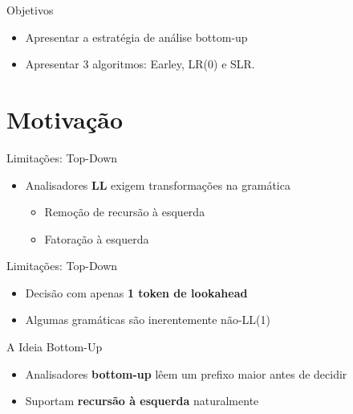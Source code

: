 \subtitle{\bf Aula 9 - Motivação}
\begin{frame}[t,plain]
    \titlepage
\end{frame}

\begin{frame}{Objetivos}

    \begin{itemize}
        \item
        Apresentar a estratégia de análise bottom-up
        \item
        Apresentar 3 algoritmos: Earley, LR(0) e SLR.
    \end{itemize}
\end{frame}


\section{Motivação}\label{motivauxe7uxe3o}

\begin{frame}{Limitações: Top-Down}

    \begin{itemize}

        \item
        Analisadores \textbf{LL} exigem transformações na gramática

        \begin{itemize}

            \item
            Remoção de recursão à esquerda
            \item
            Fatoração à esquerda
        \end{itemize}
    \end{itemize}
\end{frame}

\begin{frame}{Limitações: Top-Down}

    \begin{itemize}

        \item
        Decisão com apenas \textbf{1 token de lookahead}
        \item
        Algumas gramáticas são inerentemente não-LL(1)
    \end{itemize}
\end{frame}

\begin{frame}{A Ideia Bottom-Up}

    \begin{itemize}

        \item
        Analisadores \textbf{bottom-up} lêem um prefixo maior antes de decidir
        \item
        Suportam \textbf{recursão à esquerda} naturalmente
    \end{itemize}
\end{frame}


